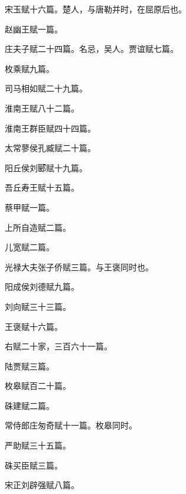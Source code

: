 \documentclass[12pt,UTF8]{ctexbook}
\begin{document}
宋玉赋十六篇。楚人，与唐勒并时，在屈原后也。



赵幽王赋一篇。



庄夫子赋二十四篇。名忌，吴人。贾谊赋七篇。



枚乘赋九篇。



司马相如赋二十九篇。



淮南王赋八十二篇。



淮南王群臣赋四十四篇。



太常蓼侯孔臧赋二十篇。



阳丘侯刘郾赋十九篇。



吾丘寿王赋十五篇。



蔡甲赋一篇。



上所自造赋二篇。



儿宽赋二篇。



光禄大夫张子侨赋三篇。与王褒同时也。



阳成侯刘德赋九篇。



刘向赋三十三篇。



王褒赋十六篇。



右赋二十家，三百六十一篇。



陆贾赋三篇。



枚皋赋百二十篇。



硃建赋二篇。



常侍郎庄匆奇赋十一篇。枚皋同时。



严助赋三十五篇。



硃买臣赋三篇。



宋正刘辟强赋八篇。
\end{document}
